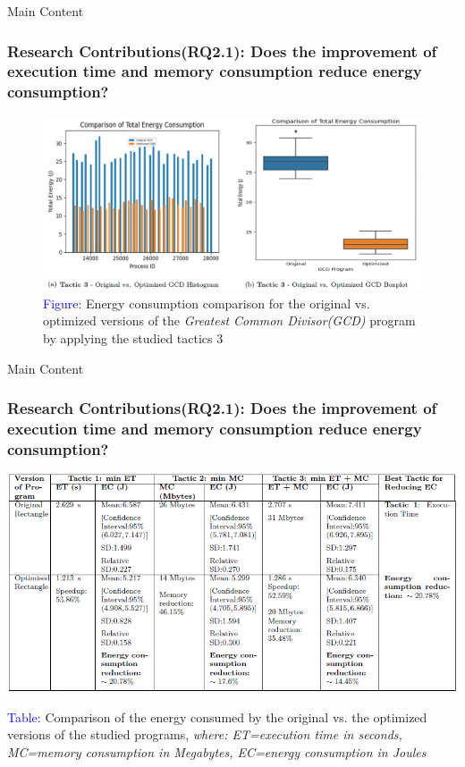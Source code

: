 \documentclass{beamer}
\begin{document}
\begin{frame}{Main Content}
  \frametitle{Research Contributions(RQ2.1): Does the improvement of execution time and memory consumption reduce energy consumption?}

  \begin{figure}
    \centering
    \includegraphics[width=1\textwidth]{figures/Hiegest_GCD.png}
    \caption*{\scriptsize{\textcolor{blue}{Figure}: Energy consumption comparison for the original vs. optimized versions of the \textit{Greatest Common Divisor(GCD)} program by applying the studied tactics 3}}
 \end{figure}
 
\end{frame}

\begin{frame}{Main Content}
  \frametitle{Research Contributions(RQ2.1): Does the improvement of execution time and memory consumption reduce energy consumption?}
  \vspace{-.2cm}
  \begin{table}
    \centering
    \includegraphics[width=\textwidth]{figures/Result_table_f_2.png}
    \caption*{\tiny{\textcolor{blue}{Table}: Comparison of the energy consumed by the original vs. the optimized versions of the studied programs, \textit{where: ET=execution time in seconds, MC=memory consumption in Megabytes, EC=energy consumption in Joules}}}
  \end{table}
\end{frame}
\end{document}
